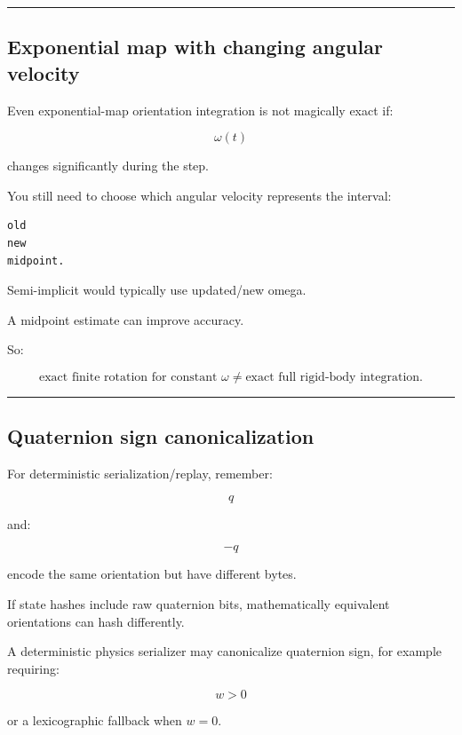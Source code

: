 \begin{center}\rule{0.5\linewidth}{0.5pt}\end{center}

\subsection{Exponential map with changing angular velocity}\label{06-engine-ii-ch038-exponential-map-with-changing-angular-velocity}

Even exponential-map orientation integration is not magically exact if:

\[
\omega(t)
\]

changes significantly during the step.

You still need to choose which angular velocity represents the interval:

\begin{verbatim}
old
new
midpoint.
\end{verbatim}

Semi-implicit would typically use updated/new omega.

A midpoint estimate can improve accuracy.

So:

\[
\boxed{
\text{exact finite rotation for constant }\omega
\neq
\text{exact full rigid-body integration}.
}
\]

\begin{center}\rule{0.5\linewidth}{0.5pt}\end{center}

\subsection{Quaternion sign canonicalization}\label{06-engine-ii-ch038-quaternion-sign-canonicalization}

For deterministic serialization/replay, remember:

\[
q
\]

and:

\[
-q
\]

encode the same orientation but have different bytes.

If state hashes include raw quaternion bits, mathematically equivalent orientations can hash differently.

A deterministic physics serializer may canonicalize quaternion sign, for example requiring:

\[
w>0
\]

or a lexicographic fallback when \(w=0\).

